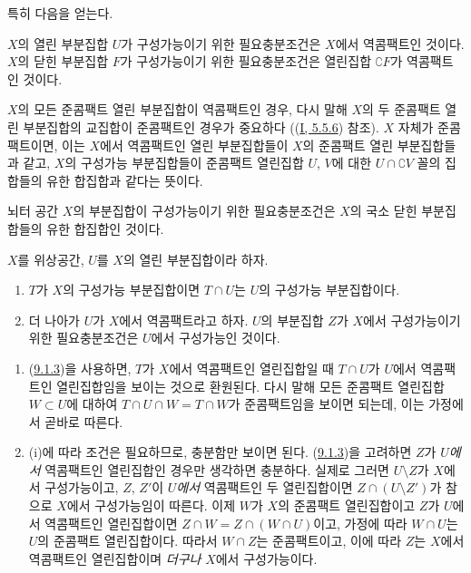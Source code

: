 특히 다음을 얻는다.

\begin{corollary}[9.1.5]
\label{0.9.1.5-ko}
$X$의 열린 부분집합 $U$가 구성가능이기 위한 필요충분조건은 $X$에서
역콤팩트인 것이다. $X$의 닫힌 부분집합 $F$가 구성가능이기 위한
필요충분조건은 열린집합 $\complement{F}$가 역콤팩트인 것이다.
\end{corollary}

\begin{env}[9.1.6]
\label{0.9.1.6-ko}
$X$의 모든 준콤팩트 열린 부분집합이 역콤팩트인 경우, 다시 말해 $X$의
두 준콤팩트 열린 부분집합의 교집합이 준콤팩트인 경우가 중요하다
((\hyperref[I.5.5.6-ko]{I, 5.5.6}) 참조). $X$ 자체가 준콤팩트이면,
이는 $X$에서 역콤팩트인 열린 부분집합들이 $X$의 준콤팩트 열린
부분집합들과 같고, $X$의 구성가능 부분집합들이 준콤팩트 열린집합
$U$, $V$에 대한 $U\cap\complement{V}$ 꼴의 집합들의 유한 합집합과
같다는 뜻이다.
\end{env}

\begin{corollary}[9.1.7]
\label{0.9.1.7-ko}
뇌터 공간 $X$의 부분집합이 구성가능이기 위한 필요충분조건은 $X$의
국소 닫힌 부분집합들의 유한 합집합인 것이다.
\end{corollary}

\begin{proposition}[9.1.8]
\label{0.9.1.8-ko}
$X$를 위상공간, $U$를 $X$의 열린 부분집합이라 하자.
\begin{enumerate}
  \item[(i)] $T$가 $X$의 구성가능 부분집합이면 $T\cap U$는 $U$의
    구성가능 부분집합이다.
  \item[(ii)] 더 나아가 $U$가 $X$에서 역콤팩트라고 하자. $U$의
    부분집합 $Z$가 $X$에서 구성가능이기 위한 필요충분조건은 $U$에서
    구성가능인 것이다.
\end{enumerate}
\end{proposition}

\begin{enumerate}
  \item[(i)] (\hyperref[0.9.1.3-ko]{9.1.3})을 사용하면, $T$가 $X$에서
    역콤팩트인 열린집합일 때 $T\cap U$가 $U$에서 역콤팩트인
    열린집합임을 보이는 것으로 환원된다. 다시 말해 모든 준콤팩트
    열린집합 $W\subset U$에 대하여 $T\cap U\cap W=T\cap W$가
    준콤팩트임을 보이면 되는데, 이는 가정에서 곧바로 따른다.
  \item[(ii)] (i)에 따라 조건은 필요하므로, 충분함만 보이면 된다.
    (\hyperref[0.9.1.3-ko]{9.1.3})을 고려하면 $Z$가 \emph{$U$에서}
    역콤팩트인 열린집합인 경우만 생각하면 충분하다. 실제로 그러면
    $U\setminus Z$가 $X$에서 구성가능이고, $Z$, $Z'$이 \emph{$U$에서}
    역콤팩트인 두 열린집합이면 $Z\cap(U\setminus Z')$가 참으로
    $X$에서 구성가능임이 따른다. 이제 $W$가 $X$의 준콤팩트
    열린집합이고 $Z$가 $U$에서 역콤팩트인 열린집합이면
    $Z\cap W=Z\cap(W\cap U)$이고, 가정에 따라 $W\cap U$는 $U$의
    준콤팩트 열린집합이다. 따라서 $W\cap Z$는 준콤팩트이고, 이에 따라
    $Z$는 $X$에서 역콤팩트인 열린집합이며 \emph{더구나} $X$에서
    구성가능이다.
\end{enumerate}

